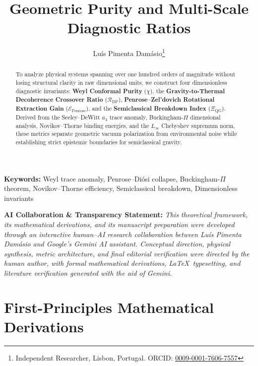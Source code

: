 \documentclass[11pt,a4paper]{article}
\title{\textbf{Geometric Purity and Multi-Scale Diagnostic Ratios}}
\author{Luís {Pimenta Damásio}\thanks{Independent Researcher, Lisbon, Portugal. ORCID: \href{https://orcid.org/0009-0001-7606-7557}{0009-0001-7606-7557}}}
\date{}
\begin{document}
\maketitle

\begin{abstract}
To analyze physical systems spanning over one hundred orders of magnitude without losing structural clarity in raw dimensional units, we construct four dimensionless diagnostic invariants: \textbf{Weyl Conformal Purity} ($\chi$), the \textbf{Gravity-to-Thermal Decoherence Crossover Ratio} ($\mathcal{R}_{\mathrm{DP}}$), \textbf{Penrose--Zel'dovich Rotational Extraction Gain} ($\mathcal{E}_{\mathrm{Penrose}}$), and the \textbf{Semiclassical Breakdown Index} ($\Xi_{\mathrm{QG}}$). Derived from the Seeley--DeWitt $a_4$ trace anomaly, Buckingham-$\Pi$ dimensional analysis, Novikov--Thorne binding energies, and the $L_\infty$ Chebyshev supremum norm, these metrics separate geometric vacuum polarization from environmental noise while establishing strict epistemic boundaries for semiclassical gravity.
\end{abstract}

\noindent\textbf{Keywords:} Weyl trace anomaly, Penrose--Diósi collapse, Buckingham-$\Pi$ theorem, Novikov--Thorne efficiency, Semiclassical breakdown, Dimensionless invariants

\vspace{0.8em}
\begin{mdframed}[backgroundcolor=gray!8,linecolor=gray!40,linewidth=1pt]
\small\noindent\textbf{AI Collaboration \& Transparency Statement:} \emph{This theoretical framework, its mathematical derivations, and its manuscript preparation were developed through an interactive human--AI research collaboration between Luís Pimenta Damásio and Google's Gemini AI assistant. Conceptual direction, physical synthesis, metric architecture, and final editorial verification were directed by the human author, with formal mathematical derivations, \LaTeX\ typesetting, and literature verification generated with the aid of Gemini.}
\end{mdframed}
\vspace{0.5em}

\section{First-Principles Mathematical Derivations}
\end{document}
